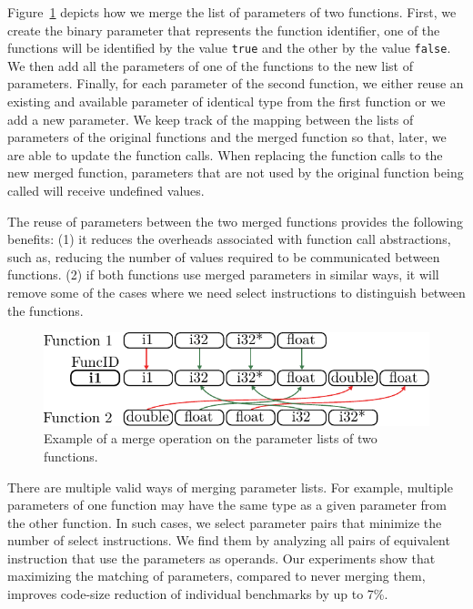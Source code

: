 Figure~\ref{fig:merged-params} depicts
how we merge the list of parameters of two functions.
First, we create the binary parameter that represents the function identifier,
one of the functions will be identified by the value \texttt{true} and the other
by the value \texttt{false}.
We then add all the parameters of one of the functions to the new list of
parameters.
Finally, for each parameter of the second function, we either reuse an existing
and available parameter of identical type from the first function or we add a
new parameter.
We keep track of the mapping between the lists of parameters of the
original functions and the merged function so that, later, we are able to
update the function calls.
When replacing the function calls to the new merged function, parameters that
are not used by the original function being called will receive undefined values.

The reuse of parameters between the two merged functions provides the following
benefits:
(1) it reduces the overheads associated with function call abstractions, such as,
reducing the number of values required to be communicated between functions.
(2) if both functions use merged parameters in similar ways, it will remove some
of the cases where we need select instructions to distinguish between the functions.

\begin{figure}[t!]
  \centering
  \includegraphics[width=0.9\linewidth]{figs/merged-params.pdf}
  \caption{Example of a merge operation on the parameter lists of two functions.}
  \label{fig:merged-params}
\end{figure}

There are multiple valid ways of merging parameter lists. For example, multiple
parameters of one function may have the same type as a given parameter from the other
function. In such cases, we select parameter pairs that minimize the number of
select instructions. We find them by analyzing all pairs of equivalent instruction
that use the parameters as operands. 
Our experiments show that maximizing the matching of parameters, compared to never
merging them, improves code-size reduction of individual benchmarks by up to 7\%.

